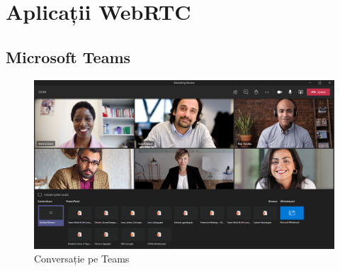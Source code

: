 \chapter{Aplicații WebRTC}
\label{chap:ch4}

\section{Microsoft Teams}
\label{chap:ch4sec1}
\begin{figure}[!htbp]
    \centering
    \includegraphics[width=12cm]{figures/ms_teams_call.png}
    \caption{Conversație pe Teams}
\end{figure}

